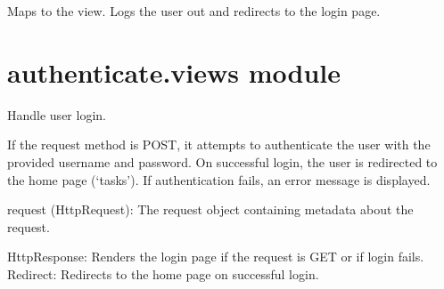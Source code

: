 \documentclass[letterpaper,10pt,english]{sphinxmanual}
\begin{document}
\begin{fulllineitems}
\label{\detokenize{authenticate:get--logout-}}
\pysigstartsignatures
{}
\pysigstopsignatures
\sphinxAtStartPar
Maps to the  view. Logs the user out and redirects to the login page.

\end{fulllineitems}



\section{authenticate.views module}
\label{\detokenize{authenticate:module-authenticate.views}}\label{\detokenize{authenticate:authenticate-views-module}}

\begin{fulllineitems}
\label{\detokenize{authenticate:authenticate.views.login}}
\pysigstartsignatures
{}
\pysigstopsignatures
\sphinxAtStartPar
Handle user login.

\sphinxAtStartPar
If the request method is POST, it attempts to authenticate the user with the provided
username and password. On successful login, the user is redirected to the home page (‘tasks’).
If authentication fails, an error message is displayed.
\begin{description}
\sphinxAtStartPar
request (HttpRequest): The request object containing metadata about the request.

\sphinxAtStartPar
HttpResponse: Renders the login page if the request is GET or if login fails.
Redirect: Redirects to the home page on successful login.

\end{description}

\end{fulllineitems}

\end{document}
